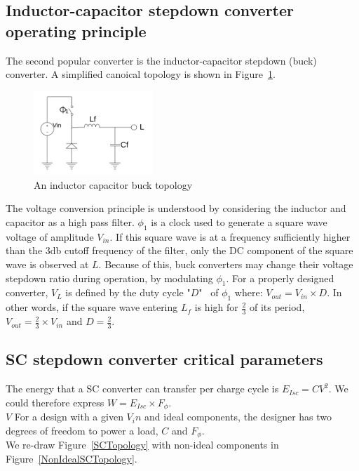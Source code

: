 \documentclass[letterpaper,twocolumn,10pt]{article}
\begin{document}
\subsection{Inductor-capacitor stepdown converter operating principle}

The second popular converter is the inductor-capacitor stepdown (buck) converter. A simplified canoical topology is shown in Figure~\ref{BKTopology}.\\
\begin{figure}[here]
\includegraphics[width=0.4\textwidth]{BKTopology}
\caption{An inductor capacitor buck topology}
\label{BKTopology}
\end{figure}

The voltage conversion principle is understood by considering the inductor and capacitor as a high pass filter. $\phi_1$ is a clock used to generate a square wave voltage of amplitude $V_{in}$. If this square wave is at a frequency sufficiently higher than the 3db cutoff frequency of the filter, only the DC component of the square wave is observed at $L$. Because of this, buck converters may change their voltage stepdown ratio during operation, by modulating $\phi_1$. For a properly designed converter, $V_L$ is defined by the duty cycle "$D$"~\cite{Kurson2006} of $\phi_1$ where: $V_{out} = V_{in} \times D$. In other words, if the square wave entering $L_f$ is high for $\frac{2}{3}$ of its period, $V_{out} = \frac{2}{3}\times V_{in}$ and $D = \frac{2}{3}$.\\ 

\subsection{SC stepdown converter critical parameters}
The energy that a SC converter can transfer per charge cycle is $E_{Isc} = CV^2$. We could therefore express $W = E_{Isc}\times F_\phi$.\\
$V$ For a design with a given $V_in$ and ideal components, the designer has two degrees of freedom to power a load, $C$ and $F_\phi$.\\  
We re-draw Figure~\ref{SCTopology} with non-ideal components in Figure~\ref{NonIdealSCTopology}.\\
\end{document}

